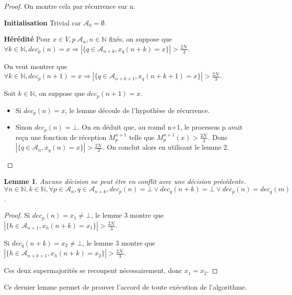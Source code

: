 \documentclass{article}
\newtheorem{lemma}{Lemme}
\begin{document}
\begin{proof}

On montre cela par récurrence sur n.

\textbf{Initialisation}
	Trivial car $\mathcal{A}_0 = \emptyset$.

\textbf{Hérédité}
	Pour $x \in V, p \ \mathcal{A}_n, n \in \mathds{N}$ fixés, on suppose que 
	$ \forall k \in \mathds{N}, dec_p(n) = x \Rightarrow| \{ q \in \mathcal{A}_{n+k} , x_q(n+k) = x \} | > \frac{2\mathcal{N}}{3}$.

	On veut montrer que 
	$ \forall k \in \mathds{N}, dec_p(n+1) = x \Rightarrow| \{ q \in \mathcal{A}_{n+k+1} , x_q(n+k+1) = x \} | > \frac{2\mathcal{N}}{3}$.

	Soit $k \in \mathds{N}$, on suppose que $dec_p(n+1) = x$.

	\begin{itemize}

		\item Si $dec_p(n) = x$, le lemme découle de l'hypothèse de récurrence.
		\item Sinon $dec_p(n) = \bot$. On en déduit que, au round n+1, le processus p avait reçu une fonction de réception $M_p^{n+1}$ telle que $M_p^{n+1}(x) > \frac{2\mathcal{N}}{3}$.
			Donc $| \{ q \in \mathcal{A}_n , x_q(n) = x \} | > \frac{2\mathcal{N}}{3}$.
			On conclut alors en utilisant le lemme 2.

	\end{itemize}
\end{proof}

\begin{lemma}
	Aucune décision ne peut être en conflit avec une décision précédente.
	$ \forall n \in \mathds{N}, k \in \mathds{N}, \forall p \in \mathcal{A}_n, q \in \mathcal{A}_{n+k},dec_p(n) = \bot \vee dec_q(n+k) = \bot \vee dec_p(n) = dec_q(m)$.
\end{lemma}
\begin{proof}

	Si $dec_p(n) = x_1 \neq \bot$,   le lemme 3 montre que $|\{h \in \mathcal{A}_{n+1}, x_h(n+k) = x_1\}| > \frac{2\mathcal{N}}{3}$.

	Si $dec_q(n+k) = x_2 \neq \bot$,   le lemme 3 montre que $|\{h \in \mathcal{A}_{n+k+1}, x_h(n+k) = x_2\}|> \frac{2\mathcal{N}}{3}$.

Ces deux supermajorités se recoupent nécessairement, donc $x_1 = x_2$.
\end{proof}

Ce dernier lemme permet de prouver l'accord de toute exécution de l'algorithme.
\end{document}
